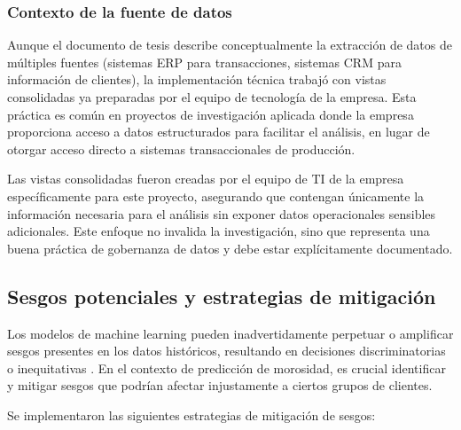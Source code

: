 \subsubsection{Contexto de la fuente de datos}
Aunque el documento de tesis describe conceptualmente la extracción de datos de múltiples fuentes (sistemas ERP para transacciones, sistemas CRM para información de clientes), la implementación técnica trabajó con vistas consolidadas ya preparadas por el equipo de tecnología de la empresa. Esta práctica es común en proyectos de investigación aplicada donde la empresa proporciona acceso a datos estructurados para facilitar el análisis, en lugar de otorgar acceso directo a sistemas transaccionales de producción.

Las vistas consolidadas fueron creadas por el equipo de TI de la empresa específicamente para este proyecto, asegurando que contengan únicamente la información necesaria para el análisis sin exponer datos operacionales sensibles adicionales. Este enfoque no invalida la investigación, sino que representa una buena práctica de gobernanza de datos y debe estar explícitamente documentado.

\subsection{Sesgos potenciales y estrategias de mitigación}
Los modelos de machine learning pueden inadvertidamente perpetuar o amplificar sesgos presentes en los datos históricos, resultando en decisiones discriminatorias o inequitativas \cite{barocas2016big}. En el contexto de predicción de morosidad, es crucial identificar y mitigar sesgos que podrían afectar injustamente a ciertos grupos de clientes.

Se implementaron las siguientes estrategias de mitigación de sesgos:


